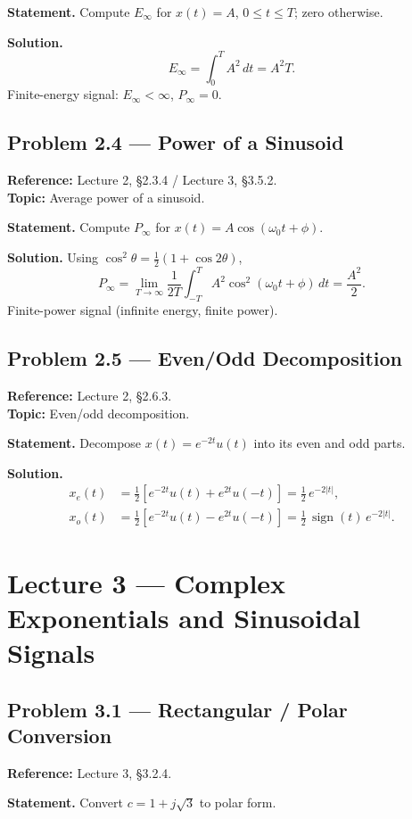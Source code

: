\documentclass[11pt]{article}
\begin{document}
\textbf{Statement.} Compute $E_\infty$ for $x(t)=A$, $0\le t\le T$; zero otherwise.

\textbf{Solution.}
\[
E_\infty = \int_0^T A^2\,dt = A^2 T.
\]
Finite-energy signal: $E_\infty<\infty$, $P_\infty = 0$.

\subsection{Problem 2.4 --- Power of a Sinusoid}
\textbf{Reference:} Lecture 2, \S 2.3.4 / Lecture 3, \S 3.5.2.\\
\textbf{Topic:} Average power of a sinusoid.

\textbf{Statement.} Compute $P_\infty$ for $x(t)=A\cos(\omega_0 t+\phi)$.

\textbf{Solution.} Using $\cos^2\theta=\tfrac12(1+\cos 2\theta)$,
\[
P_\infty = \lim_{T\to\infty}\frac{1}{2T}\int_{-T}^T A^2\cos^2(\omega_0 t+\phi)\,dt = \frac{A^2}{2}.
\]
Finite-power signal (infinite energy, finite power).

\subsection{Problem 2.5 --- Even/Odd Decomposition}
\textbf{Reference:} Lecture 2, \S 2.6.3.\\
\textbf{Topic:} Even/odd decomposition.

\textbf{Statement.} Decompose $x(t)=e^{-2t}u(t)$ into its even and odd parts.

\textbf{Solution.}
\begin{align*}
x_e(t) &= \tfrac12[e^{-2t}u(t) + e^{2t}u(-t)] = \tfrac12\,e^{-2|t|},\\
x_o(t) &= \tfrac12[e^{-2t}u(t) - e^{2t}u(-t)] = \tfrac12\,\operatorname{sign}(t)\,e^{-2|t|}.
\end{align*}

\section{Lecture 3 --- Complex Exponentials and Sinusoidal Signals}

\subsection{Problem 3.1 --- Rectangular / Polar Conversion}
\textbf{Reference:} Lecture 3, \S 3.2.4.

\textbf{Statement.} Convert $c=1+j\sqrt 3$ to polar form.
\end{document}
